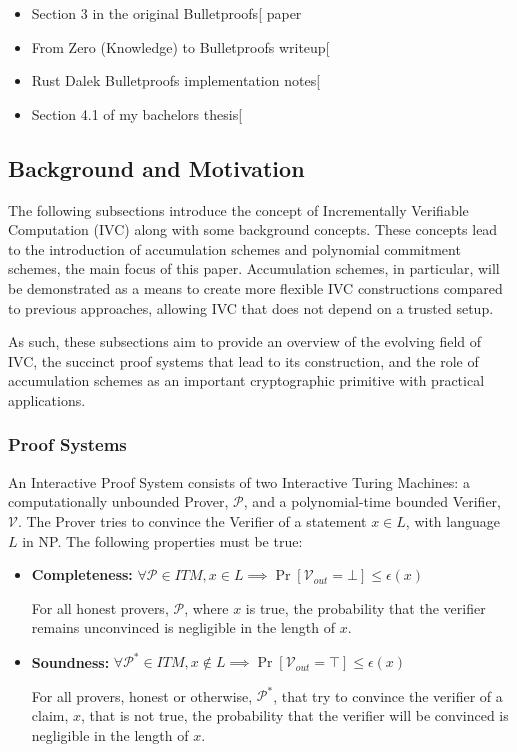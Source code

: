 \documentclass[
]{article}
\providecommand{\tightlist}{%
  \setlength{\itemsep}{0pt}\setlength{\parskip}{0pt}}
\newcommand*\Pc{\mathcal{P}}
\newcommand*\Vc{\mathcal{V}}
\begin{document}
\begin{itemize}
\tightlist
\item
  Section 3 in the original
  Bulletproofs{[}\citeproc{ref-bulletproofs}{Bünz et al. 2017}{]} paper
\item
  From Zero (Knowledge) to Bulletproofs
  writeup{[}\citeproc{ref-from0k2bp}{Gibson 2022}{]}
\item
  Rust Dalek Bulletproofs implementation
  notes{[}\citeproc{ref-dalek-docs}{Valence et al. 2023}{]}
\item
  Section 4.1 of my bachelors
  thesis{[}\citeproc{ref-hacspec-bulletproofs}{Jakobsen and Larsen
  2022}{]}
\end{itemize}

\subsection{Background and Motivation}\label{background-and-motivation}

The following subsections introduce the concept of Incrementally
Verifiable Computation (IVC) along with some background concepts. These
concepts lead to the introduction of accumulation schemes and polynomial
commitment schemes, the main focus of this paper. Accumulation schemes,
in particular, will be demonstrated as a means to create more flexible
IVC constructions compared to previous approaches, allowing IVC that
does not depend on a trusted setup.

As such, these subsections aim to provide an overview of the evolving
field of IVC, the succinct proof systems that lead to its construction,
and the role of accumulation schemes as an important cryptographic
primitive with practical applications.

\subsubsection{Proof Systems}\label{proof-systems}

An Interactive Proof System consists of two Interactive Turing Machines:
a computationally unbounded Prover, \(\Pc\), and a polynomial-time
bounded Verifier, \(\Vc\). The Prover tries to convince the Verifier of
a statement \(x \in L\), with language \(L\) in NP. The following
properties must be true:

\begin{itemize}
\item
  \textbf{Completeness:}
  \(\forall \Pc \in ITM, x\in L \implies \Pr[\Vc_{out} = \bot] \leq \epsilon(x)\)

  For all honest provers, \(\Pc\), where \(x\) is true, the probability
  that the verifier remains unconvinced is negligible in the length of
  \(x\).
\item
  \textbf{Soundness:}
  \(\forall \Pc^* \in ITM, x \notin L \implies \Pr[\Vc_{out} = \top] \leq \epsilon(x)\)

  For all provers, honest or otherwise, \(\Pc^*\), that try to convince
  the verifier of a claim, \(x\), that is not true, the probability that
  the verifier will be convinced is negligible in the length of \(x\).
\end{itemize}
\end{document}
